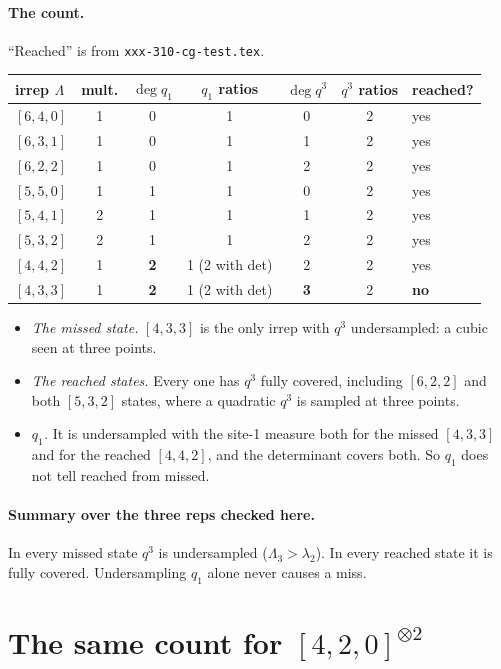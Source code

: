 \documentclass[11pt]{article}
\newcommand{\nb}[1]{\texttt{#1}}
\theoremstyle{definition}
\theoremstyle{remark}
\begin{document}
\paragraph{The count.} ``Reached'' is from \nb{xxx-310-cg-test.tex}.
\begin{center}
\begin{tabular}{lcccccl}\toprule
irrep $\Lambda$ & mult. & $\deg q_1$ & $q_1$ ratios & $\deg q^3$ & $q^3$ ratios & reached?\\\midrule
$[6,4,0]$ & 1 & 0 & 1 & 0 & 2 & yes\\
$[6,3,1]$ & 1 & 0 & 1 & 1 & 2 & yes\\
$[6,2,2]$ & 1 & 0 & 1 & 2 & 2 & yes\\
$[5,5,0]$ & 1 & 1 & 1 & 0 & 2 & yes\\
$[5,4,1]$ & 2 & 1 & 1 & 1 & 2 & yes\\
$[5,3,2]$ & 2 & 1 & 1 & 2 & 2 & yes\\
$[4,4,2]$ & 1 & \textbf{2} & 1 (2 with det) & 2 & 2 & yes\\
$[4,3,3]$ & 1 & \textbf{2} & 1 (2 with det) & \textbf{3} & 2 & \textbf{no}\\\bottomrule
\end{tabular}
\end{center}
\begin{itemize}
\item \emph{The missed state.} $[4,3,3]$ is the only irrep with $q^3$ undersampled: a cubic seen at three points.
\item \emph{The reached states.} Every one has $q^3$ fully covered, including $[6,2,2]$ and both $[5,3,2]$ states, where a quadratic $q^3$ is sampled at three points.
\item \emph{$q_1$.} It is undersampled with the site-1 measure both for the missed $[4,3,3]$ and for the reached $[4,4,2]$, and the determinant covers both. So $q_1$ does not tell reached from missed.
\end{itemize}

\paragraph{Summary over the three reps checked here.} In every missed state $q^3$ is undersampled ($\Lambda_3>\lambda_2$). In every reached state it is fully covered. Undersampling $q_1$ alone never causes a miss.

\section{The same count for $[4,2,0]^{\otimes2}$}\label{sec:420}
\end{document}
